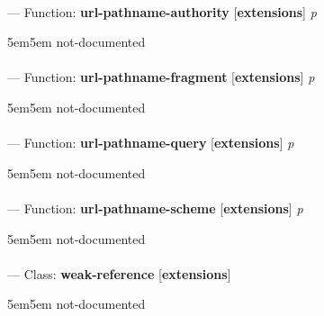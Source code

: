 \paragraph{}
\label{EXTENSIONS:URL-PATHNAME-AUTHORITY}
--- Function: \textbf{url-pathname-authority} [\textbf{extensions}] \textit{p}

\begin{adjustwidth}{5em}{5em}
not-documented
\end{adjustwidth}

\paragraph{}
\label{EXTENSIONS:URL-PATHNAME-FRAGMENT}
--- Function: \textbf{url-pathname-fragment} [\textbf{extensions}] \textit{p}

\begin{adjustwidth}{5em}{5em}
not-documented
\end{adjustwidth}

\paragraph{}
\label{EXTENSIONS:URL-PATHNAME-QUERY}
--- Function: \textbf{url-pathname-query} [\textbf{extensions}] \textit{p}

\begin{adjustwidth}{5em}{5em}
not-documented
\end{adjustwidth}

\paragraph{}
\label{EXTENSIONS:URL-PATHNAME-SCHEME}
--- Function: \textbf{url-pathname-scheme} [\textbf{extensions}] \textit{p}

\begin{adjustwidth}{5em}{5em}
not-documented
\end{adjustwidth}

\paragraph{}
\label{EXTENSIONS:WEAK-REFERENCE}
--- Class: \textbf{weak-reference} [\textbf{extensions}] \textit{}

\begin{adjustwidth}{5em}{5em}
not-documented
\end{adjustwidth}

